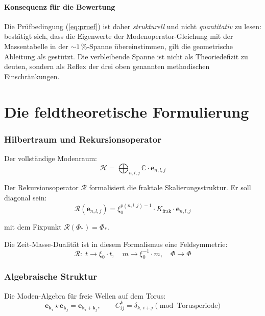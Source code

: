 \subsection*{Konsequenz für die Bewertung}

Die Prüfbedingung (\ref{eq:pruef}) ist daher \emph{strukturell} und
nicht \emph{quantitativ} zu lesen: bestätigt sich, dass die Eigenwerte
der Modenoperator-Gleichung mit der Massentabelle in der
$\sim 1\,\%$-Spanne übereinstimmen, gilt die geometrische Ableitung
als gestützt. Die verbleibende Spanne ist nicht als Theoriedefizit zu
deuten, sondern als Reflex der drei oben genannten methodischen
Einschränkungen.

\part{Die feldtheoretische Formulierung}

\section{Hilbertraum und Rekursionsoperator}

Der vollständige Modenraum:
\begin{equation}
  \mathcal{H} = \bigoplus_{n,l,j} \mathbb{C}\cdot\mathbf{e}_{n,l,j}
\end{equation}

Der Rekursionsoperator $\mathcal{R}$ formalisiert die fraktale
Skalierungsstruktur. Er soll diagonal sein:
\begin{equation}
  \mathcal{R}(\mathbf{e}_{n,l,j})
  = \xi_0^{p(n,l,j)-1} \cdot K_{\text{frak}} \cdot \mathbf{e}_{n,l,j}
\end{equation}

mit dem Fixpunkt $\mathcal{R}(\Phi_*) = \Phi_*$.

Die Zeit-Masse-Dualität ist in diesem Formalismus eine Feldsymmetrie:
\begin{equation}
  \mathcal{R}:\; t \to \xi_0 \cdot t,\quad m \to \xi_0^{-1} \cdot m,
  \quad \Phi \to \Phi
\end{equation}

\section{Algebraische Struktur}

Die Moden-Algebra für freie Wellen auf dem Torus:
\begin{equation}
  \mathbf{e}_{\mathbf{k}_i} \star \mathbf{e}_{\mathbf{k}_j}
  = \mathbf{e}_{\mathbf{k}_i + \mathbf{k}_j},
  \qquad
  C_{ij}^k = \delta_{k,\,i+j} \pmod{\text{Torusperiode}}
\end{equation}

